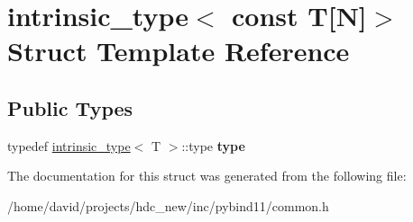 \hypertarget{structintrinsic__type_3_01const_01_t[_n]_4}{}\section{intrinsic\+\_\+type$<$ const T\mbox{[}N\mbox{]}$>$ Struct Template Reference}
\label{structintrinsic__type_3_01const_01_t[_n]_4}
\subsection*{Public Types}
\begin{DoxyCompactItemize}
\item 
typedef \hyperlink{structintrinsic__type}{intrinsic\+\_\+type}$<$ T $>$\+::type {\bfseries type}\hypertarget{structintrinsic__type_3_01const_01_t[_n]_4_a7b6f6511109ee2c22f02ca0fd976b3cc}{}\label{structintrinsic__type_3_01const_01_t[_n]_4_a7b6f6511109ee2c22f02ca0fd976b3cc}

\end{DoxyCompactItemize}


The documentation for this struct was generated from the following file\+:\begin{DoxyCompactItemize}
\item 
/home/david/projects/hdc\+\_\+new/inc/pybind11/common.\+h\end{DoxyCompactItemize}
